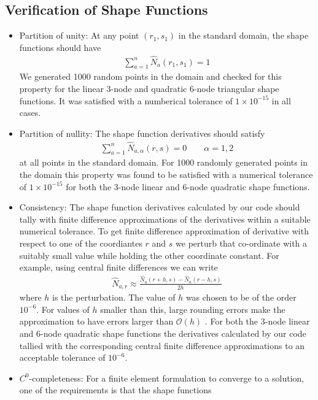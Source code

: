 \documentclass[../main.tex]{subfiles}
\begin{document}
\subsection*{Verification of Shape Functions}
\begin{itemize}
\item Partition of unity: At any point $(r_1,s_1)$ in the standard
  domain, the shape functions should have
  \begin{align*}
    \sum_{a=1}^n\hat{N}_a(r_1,s_1) = 1
  \end{align*}
  We generated 1000 random points in the domain and checked for this
  property for the linear 3-node and quadratic 6-node triangular shape
  functions. It was satisfied with a numberical tolerance of
  $1\times10^{-15}$ in all cases.
\item Partition of nullity: The shape function derivatives should
  satisfy
  \begin{align*}
    \sum_{a=1}^n\hat{N}_{a,\alpha}(r,s) = 0\qquad\alpha=1,2
  \end{align*} at all points in the standard
  domain. For 1000 randomly generated points in the domain this
  property was found to be satisfied with a numerical tolerance of
  $1\times10^{-15}$ for both the 3-node linear and 6-node quadratic 
  shape functions.
\item Consistency: The shape function derivatives calculated by our
  code should tally with finite difference approximations of the
  derivatives within a suitable numerical tolerance. To get finite
  difference approximation of derivative with respect to one of the
  coordiantes $r$ and $s$ we perturb that co-ordinate with a suitably
  small value while holding the other coordinate constant. For
  example, using central finite differences we can write
  \begin{align*}
    \hat{N}_{a,r} \approx \frac{\hat{N}_{a}(r+h,s) - \hat{N}_{a}(r-h,s)}{2h}
  \end{align*}
  where $h$ is the perturbation. The value of $h$ was chosen to be of
  the order $10^{-6}$. For values of $h$ smaller than this, large
  rounding errors make the approximation to have errors larger than
  $\mathcal{O}(h)$ . For both the 3-node linear and 6-node quadratic
  shape functions the derivatives calculated by our code tallied with
  the corresponding central finite difference approximations to an
  acceptable tolerance of $10^{-6}$.
\item $C^0$-completeness: For a finite element formulation to converge
  to a solution, one of the requirements is that the shape functions

\end{itemize}
\end{document}
